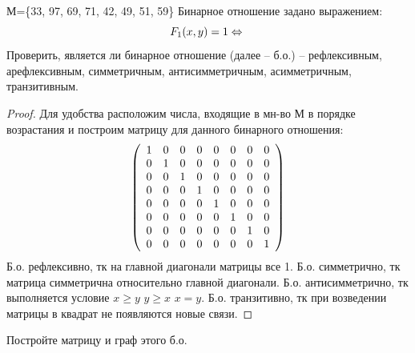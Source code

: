\begin{problem}
    
    М=\{33, 97, 69, 71, 42, 49, 51, 59\}\newline
	Бинарное отношение задано выражением: \newline
   $$ F_{1}(x,y)=1\Leftrightarrow\newline$$
 \newline
 Проверить, является ли бинарное отношение (далее -- б.о.) -- рефлексивным, арефлексивным, симметричным, антисимметричным, асимметричным, транзитивным.
\end{problem}

\begin{proof}
    Для удобства расположим числа, входящие в мн-во М в порядке возрастания и построим матрицу для данного бинарного отношения:
	$$ \left( \begin{array}{c c c c c c c c } 
 
 1 & 0 & 0 & 0 & 0 & 0 & 0 & 0 \\ 

 0 & 1 & 0 & 0 & 0 & 0 & 0 & 0 \\

 0 & 0 & 1 & 0 & 0 & 0 & 0 & 0 \\
 
 0 & 0 & 0 & 1 & 0 & 0 & 0 & 0 \\
 
 0 & 0 & 0 & 0 & 1 & 0 & 0 & 0 \\
 
 0 & 0 & 0 & 0 & 0 & 1 & 0 & 0 \\
 
 0 & 0 & 0 & 0 & 0 & 0 & 1 & 0 \\
 
 0 & 0 & 0 & 0 & 0 & 0 & 0 & 1 \end {array} \right) $$
 Б.о. рефлексивно, тк на главной диагонали матрицы все 1.
    \newline
     Б.о. симметрично, тк матрица симметрична относительно главной диагонали.
    \newline
     Б.о. антисимметрично, тк выполняется условие $x \ge y$ \wedge $y \ge x$ \Rightarrow $x = y$.
    \newline
    Б.о. транзитивно, тк при возведении матрицы в квадрат не появляются новые связи.
     \newline
\end{proof}

\begin{problem}
	Постройте матрицу и граф этого б.о.
\end{problem}

